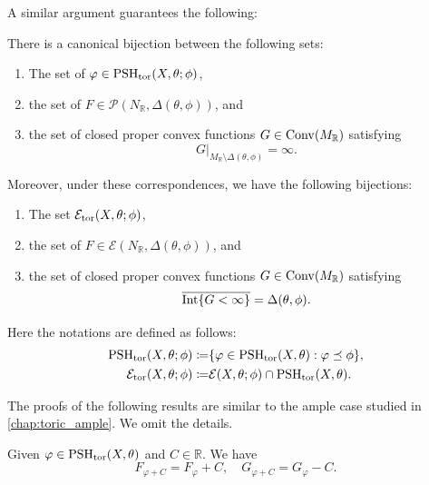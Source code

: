 A similar argument guarantees the following:
\begin{corollary}\label{cor:toric-big:L860}
    There is a canonical bijection between the following sets:
    \begin{enumerate}
        \item\label{itm:chapter-toricb:L739:1} The set of $\varphi\in \mathrm{PSH}_{\mathrm{tor}}(X,\theta;\phi)$,
        \item\label{itm:chapter-toricb:L739:2} the set of $F\in \mathcal{P}(N_{\mathbb{R}},\Delta(\theta,\phi))$, and
        \item\label{itm:chapter-toricb:L739:3} the set of closed proper convex functions $G\in \mathrm{Conv}(M_{\mathbb{R}})$ satisfying
        \[
        G|_{M_{\mathbb{R}}\setminus \Delta(\theta,\phi)}=\infty.
        \]
    \end{enumerate}
    Moreover, under these correspondences, we have the following bijections:
    \begin{enumerate}
        \item\label{itm:chapter-toricb:L748:1} The set $\mathcal{E}_{\mathrm{tor}}(X,\theta;\phi)$,
        \item\label{itm:chapter-toricb:L748:2} the set of $F\in \mathcal{E}(N_{\mathbb{R}},\Delta(\theta,\phi))$, and
        \item\label{itm:chapter-toricb:L748:3} the set of closed proper convex functions $G\in \mathrm{Conv}(M_{\mathbb{R}})$ satisfying
        \[
            \overline{\operatorname{Int} \{G<\infty\}}=\Delta(\theta,\phi).
        \]
    \end{enumerate}
\end{corollary}
Here the notations are defined as follows:
\[
\begin{aligned}
\mathrm{PSH}_{\mathrm{tor}}(X,\theta;\phi)\coloneqq & \{ \varphi\in \mathrm{PSH}_{\mathrm{tor}}(X,\theta):\varphi\preceq \phi \},\\
\mathcal{E}_{\mathrm{tor}}(X,\theta;\phi)\coloneqq & \mathcal{E}(X,\theta;\phi)\cap \mathrm{PSH}_{\mathrm{tor}}(X,\theta).
\end{aligned}
\]


The proofs of the following results are similar to the ample case studied in \cref{chap:toric_ample}. We omit the details.



\begin{proposition}\label{prop:toricpluscstbig}
    Given $\varphi\in \mathrm{PSH}_{\mathrm{tor}}(X,\theta)$ and $C\in \mathbb{R}$. We have
    \[
    F_{\varphi+C}=F_{\varphi}+C,\quad G_{\varphi+C}=G_{\varphi}-C.
    \]
\end{proposition}

